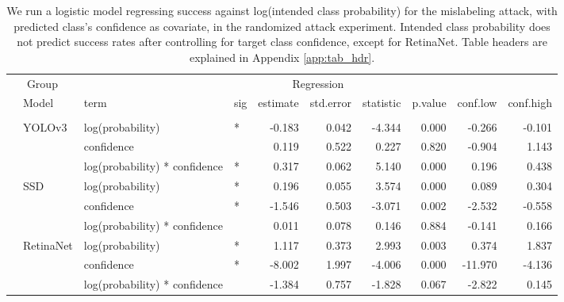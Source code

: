 \begin{longtable}[t]{llllrrrrrr}
\caption{\label{tab:mislabel_conf_table}We run a logistic model regressing success against log(intended class probability) for the mislabeling attack, with predicted class's confidence as covariate, in the randomized attack experiment. Intended class probability does not predict success rates after controlling for target class confidence, except for RetinaNet. Table headers are explained in Appendix \ref{app:tab_hdr}.}\\
\toprule
\multicolumn{2}{c}{Group} & \multicolumn{8}{c}{Regression} \\
\cmidrule(l{3pt}r{3pt}){1-2} \cmidrule(l{3pt}r{3pt}){3-10}
 & Model & term & sig & estimate & std.error & statistic & p.value & conf.low & conf.high\\
\midrule
\addlinespace[0.3em]
\multicolumn{10}{l}{\textbf{Mislabeling}}\\
\hspace{1em} & YOLOv3 & log(probability) & * & -0.183 & 0.042 & -4.344 & 0.000 & -0.266 & -0.101\\
\cmidrule{3-10}\nopagebreak
\hspace{1em} &  & confidence &  & 0.119 & 0.522 & 0.227 & 0.820 & -0.904 & 1.143\\
\cmidrule{3-10}\nopagebreak
\hspace{1em} &  & log(probability) * confidence & * & 0.317 & 0.062 & 5.140 & 0.000 & 0.196 & 0.438\\
\cmidrule{2-10}\nopagebreak
\hspace{1em} & SSD & log(probability) & * & 0.196 & 0.055 & 3.574 & 0.000 & 0.089 & 0.304\\
\cmidrule{3-10}\nopagebreak
\hspace{1em} &  & confidence & * & -1.546 & 0.503 & -3.071 & 0.002 & -2.532 & -0.558\\
\cmidrule{3-10}\nopagebreak
\hspace{1em} &  & log(probability) * confidence &  & 0.011 & 0.078 & 0.146 & 0.884 & -0.141 & 0.166\\
\cmidrule{2-10}\nopagebreak
\hspace{1em} & RetinaNet & log(probability) & * & 1.117 & 0.373 & 2.993 & 0.003 & 0.374 & 1.837\\
\cmidrule{3-10}\nopagebreak
\hspace{1em} &  & confidence & * & -8.002 & 1.997 & -4.006 & 0.000 & -11.970 & -4.136\\
\cmidrule{3-10}\nopagebreak
\hspace{1em} &  & log(probability) * confidence &  & -1.384 & 0.757 & -1.828 & 0.067 & -2.822 & 0.145\\

\end{longtable}
